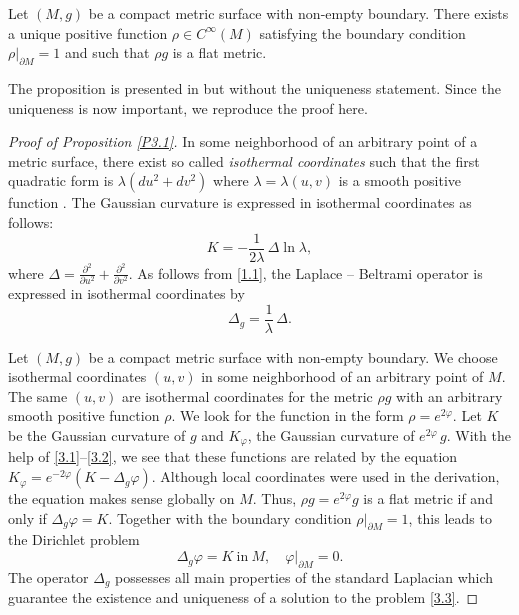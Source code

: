 \documentclass[12pt,reqno]{amsart}
\begin{document}
\begin{proposition} \label{P3.1}
Let $(M,g)$ be a compact metric surface with non-empty boundary. There exists a unique positive function $\rho\in C^\infty(M)$
satisfying the boundary condition $\rho|_{\partial M}=1$ and such that $\rho g$ is a flat metric.
\end{proposition}

The proposition is presented in \cite[Lemma 3.1]{Sr2} but without the uniqueness statement. Since the uniqueness is now important, we reproduce the proof here.

\begin{proof}[Proof of Proposition \ref{P3.1}]
In some neighborhood of an arbitrary point of a metric surface, there exist so called {\it isothermal coordinates} such that the first quadratic form is $\lambda(du^2+dv^2)$ where $\lambda=\lambda(u,v)$ is a smooth positive function \cite{Ch}. The Gaussian curvature is expressed in isothermal coordinates as follows:
\begin{equation}
K=-\frac{1}{2\lambda}\,\Delta\ln\lambda,
                                \label{3.1}
\end{equation}
where $\Delta=\frac{\partial^2}{\partial u^2}+\frac{\partial^2}{\partial v^2}$.
As follows from \eqref{1.1}, the Laplace -- Beltrami operator is expressed in isothermal coordinates by
\begin{equation}
\Delta_g=\frac{1}{\lambda}\,\Delta.
                                \label{3.2}
\end{equation}

Let $(M,g)$ be a compact metric surface with non-empty boundary. We choose isothermal coordinates $(u,v)$ in some neighborhood of an arbitrary point of $M$.  The same $(u,v)$ are  isothermal coordinates for the metric $\rho g$ with an arbitrary smooth positive function $\rho$. We look for the function in the form $\rho=e^{2\varphi}$. Let $K$ be the Gaussian curvature of $g$ and $K_\varphi$, the Gaussian curvature of $e^{2\varphi}\,g$.
With the help of \eqref{3.1}--\eqref{3.2}, we see that these functions are related by the equation
$
K_\varphi=e^{-2\varphi}(K-\Delta_g\varphi).
$
Although local coordinates were used in the derivation, the equation makes sense globally on $M$. Thus, $\rho g=e^{2\varphi}g$ is a flat metric if and only if $\Delta_g\varphi=K$. Together with the boundary condition $\rho|_{\partial M}=1$, this leads to the Dirichlet problem
\begin{equation}
\Delta_g\varphi=K\ \mbox{in}\ M,\quad\varphi|_{\partial M}=0.
                                \label{3.3}
\end{equation}
The operator $\Delta_g$ possesses all main properties of the standard Laplacian which guarantee the existence and uniqueness of a solution to the problem \eqref{3.3}.
\end{proof}
\end{document}
